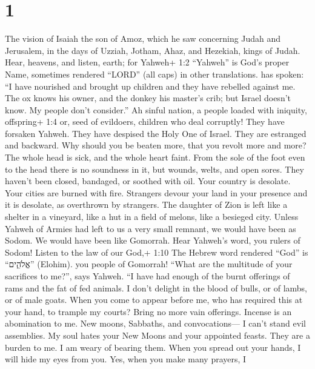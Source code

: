 \hypertarget{section}{%
\section{1}\label{section}}

 The vision of Isaiah the son of Amoz, which he saw
concerning Judah and Jerusalem, in the days of Uzziah, Jotham, Ahaz, and
Hezekiah, kings of Judah.  Hear, heavens, and listen, earth;
for Yahweh+ 1:2 ``Yahweh'' is God's proper Name, sometimes rendered
``LORD'' (all caps) in other translations. has spoken: ``I have
nourished and brought up children and they have rebelled against me.
 The ox knows his owner, and the donkey his master's crib;
but Israel doesn't know. My people don't consider.''  Ah
sinful nation, a people loaded with iniquity, offspring+ 1:4 or, seed of
evildoers, children who deal corruptly! They have forsaken Yahweh. They
have despised the Holy One of Israel. They are estranged and backward.
 Why should you be beaten more, that you revolt more and
more? The whole head is sick, and the whole heart faint. 
From the sole of the foot even to the head there is no soundness in it,
but wounds, welts, and open sores. They haven't been closed, bandaged,
or soothed with oil.  Your country is desolate. Your cities
are burned with fire. Strangers devour your land in your presence and it
is desolate, as overthrown by strangers.  The daughter of
Zion is left like a shelter in a vineyard, like a hut in a field of
melons, like a besieged city.  Unless Yahweh of Armies had
left to us a very small remnant, we would have been as Sodom. We would
have been like Gomorrah.  Hear Yahweh's word, you rulers of
Sodom! Listen to the law of our God,+ 1:10 The Hebrew word rendered
``God'' is ``אֱלֹהִ֑ים'' (Elohim). you people of Gomorrah! 
``What are the multitude of your sacrifices to me?'', says Yahweh. ``I
have had enough of the burnt offerings of rams and the fat of fed
animals. I don't delight in the blood of bulls, or of lambs, or of male
goats.  When you come to appear before me, who has required
this at your hand, to trample my courts?  Bring no more
vain offerings. Incense is an abomination to me. New moons, Sabbaths,
and convocations--- I can't stand evil assemblies.  My soul
hates your New Moons and your appointed feasts. They are a burden to me.
I am weary of bearing them.  When you spread out your
hands, I will hide my eyes from you. Yes, when you make many prayers, I
